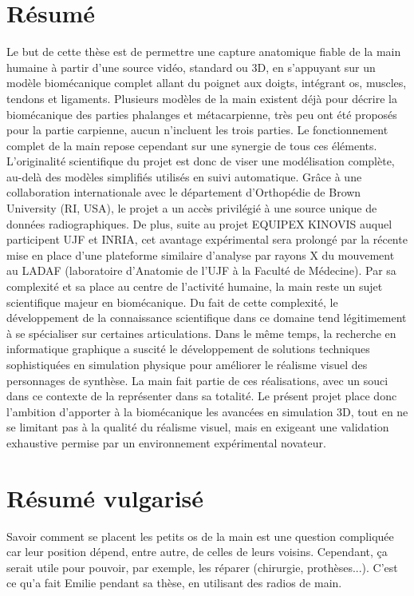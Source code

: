 \documentclass[a4paper]{leaflet}
\begin{document}
\section*{Résumé}
Le but de cette thèse est de permettre une capture anatomique fiable de la main humaine à partir d'une source vidéo, standard ou 3D, en s'appuyant sur un modèle biomécanique complet allant du poignet aux doigts, intégrant os, muscles, tendons et ligaments. Plusieurs modèles de la main existent déjà pour décrire la biomécanique des parties phalanges et métacarpienne, très peu ont été proposés pour la partie carpienne, aucun n'incluent les trois parties. Le fonctionnement complet de la main repose cependant sur une synergie de tous ces éléments. L'originalité scientifique du projet est donc de viser une modélisation complète, au-delà des modèles simplifiés utilisés en suivi automatique. Grâce à une collaboration internationale avec le département d'Orthopédie de Brown University (RI, USA), le projet a un accès privilégié à une source unique de données radiographiques. De plus, suite au projet EQUIPEX KINOVIS auquel participent UJF et INRIA, cet avantage expérimental sera prolongé par la récente mise en place d'une plateforme similaire d'analyse par rayons X du mouvement au LADAF (laboratoire d'Anatomie de l'UJF à la Faculté de Médecine). Par sa complexité et sa place au centre de l'activité humaine, la main reste un sujet scientifique majeur en biomécanique. Du fait de cette complexité, le développement de la connaissance scientifique dans ce domaine tend légitimement à se spécialiser sur certaines articulations. Dans le même temps, la recherche en informatique graphique a suscité le développement de solutions techniques sophistiquées en simulation physique pour améliorer le réalisme visuel des personnages de synthèse. La main fait partie de ces réalisations, avec un souci dans ce contexte de la représenter dans sa totalité. Le présent projet place donc l'ambition d'apporter à la biomécanique les avancées en simulation 3D, tout en ne se limitant pas à la qualité du réalisme visuel, mais en exigeant une validation exhaustive permise par un environnement expérimental novateur.
\section*{Résumé vulgarisé}
Savoir comment se placent les petits os de la main est une question compliquée car leur position dépend, entre autre, de celles de leurs voisins. Cependant, ça serait utile pour pouvoir, par exemple, les réparer (chirurgie, prothèses...). C'est ce qu'a fait Emilie pendant sa thèse, en utilisant des radios de main.
\end{document}
